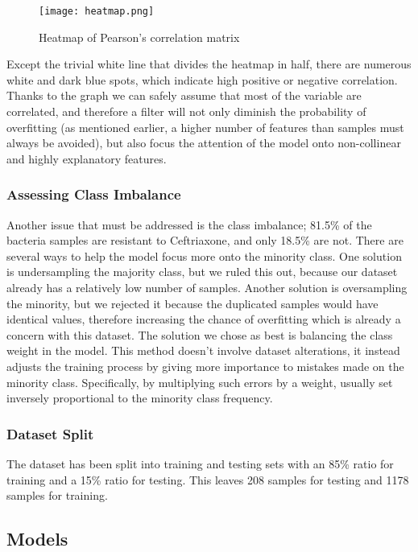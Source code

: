 \documentclass{article}
\begin{document}
\begin{figure}
	\centering
	\texttt{[image: heatmap.png]}
	 \vspace{-3em}
	\caption{Heatmap of Pearson's correlation matrix}
\end{figure}

Except the trivial white line that divides the heatmap in half, there are numerous white and dark blue spots, which indicate high positive or negative correlation. Thanks to the graph we can safely assume that most of the variable are correlated, and therefore a filter will not only diminish the probability of overfitting (as mentioned earlier, a higher number of features than samples must always be avoided), but also focus the attention of the model onto non-collinear and highly explanatory features. 

\subsubsection{Assessing Class Imbalance}

Another issue that must be addressed is the class imbalance; 81.5\% of the bacteria samples are resistant to Ceftriaxone, and only 18.5\% are not. There are several ways to help the model focus more onto the minority class. One solution is undersampling the majority class, but we ruled this out, because our dataset already has a relatively low number of samples. Another solution is oversampling the minority, but we rejected it because the duplicated samples would have identical values, therefore increasing the chance of overfitting which is already a concern with this dataset. The solution we chose as best is balancing the class weight in the model. This method doesn't involve dataset alterations, it instead adjusts the training process by giving more importance to mistakes made on the minority class. Specifically, by multiplying such errors by a weight, usually set inversely proportional to the minority class frequency.

\subsubsection{Dataset Split}

The dataset has been split into training and testing sets with an 85\% ratio for training and a 15\% ratio for testing. This leaves 208 samples for testing and 1178 samples for training.

\subsection{Models}
\end{document}
